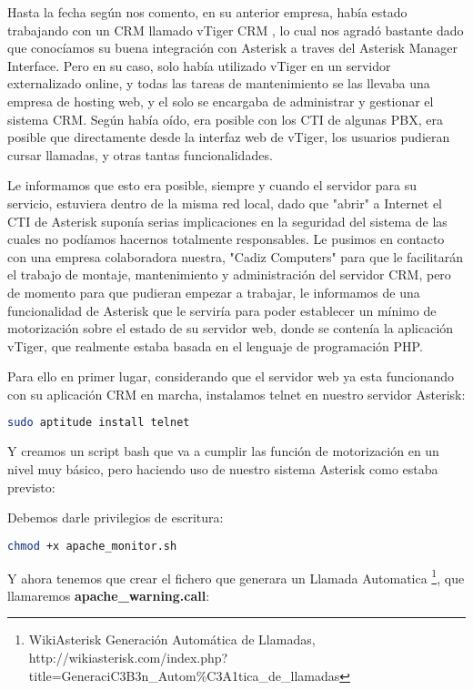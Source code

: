 Hasta la fecha según nos comento, en su anterior empresa, había estado trabajando con un CRM llamado vTiger CRM \cite{website:vtiger}, lo cual nos agradó bastante dado que conocíamos su buena integración con Asterisk a traves del Asterisk Manager Interface. Pero en su caso, solo había utilizado vTiger en un servidor externalizado online, y todas las tareas de mantenimiento se las llevaba una empresa de hosting web, y el solo se encargaba de administrar y gestionar el sistema CRM. Según había oído, era posible con los CTI \cite{website:ctiwikipedia} de algunas PBX, era posible que directamente desde la interfaz web de vTiger, los usuarios pudieran cursar llamadas, y otras tantas funcionalidades.

Le informamos que esto era posible, siempre y cuando el servidor para su servicio, estuviera dentro de la misma red local, dado que "abrir" a Internet el CTI de Asterisk suponía serias implicaciones en la seguridad del sistema de las cuales no podíamos hacernos totalmente responsables. Le pusimos en contacto con una empresa colaboradora nuestra, "Cadiz Computers" para que le facilitarán el trabajo de montaje, mantenimiento y administración del servidor CRM, pero de momento para que pudieran empezar a trabajar, le informamos de una funcionalidad de Asterisk que le serviría para poder establecer un mínimo de motorización sobre el estado de su servidor web, donde se contenía la aplicación vTiger, que realmente estaba basada en el lenguaje de programación PHP.

Para ello en primer lugar, considerando que el servidor web ya esta funcionando con su aplicación CRM en marcha, instalamos telnet en nuestro servidor Asterisk:

\begin{lstlisting}[language=sh]
sudo aptitude install telnet
\end{lstlisting}

Y creamos un script bash que va a cumplir las función de motorización en un nivel muy básico, pero haciendo uso de nuestro sistema Asterisk como estaba previsto:



Debemos darle privilegios de escritura:

\begin{lstlisting}[language=sh]
chmod +x apache_monitor.sh
\end{lstlisting}

Y ahora tenemos que crear el fichero que generara un Llamada Automatica \footnote{WikiAsterisk Generación Automática de Llamadas, \\ http://wikiasterisk.com/index.php?title=GeneraciC3B3n\_Autom\%C3A1tica\_de\_llamadas}, que llamaremos \textbf{apache\_warning.call}:

